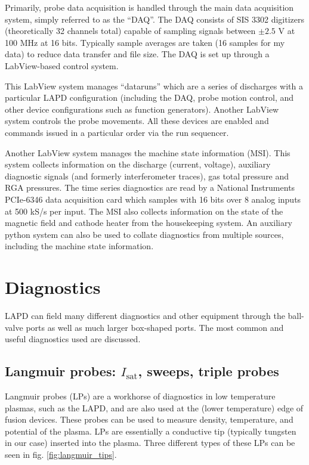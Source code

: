 Primarily, probe data acquisition is handled through the main data acquisition system, simply referred to as the ``DAQ''. The DAQ consists of SIS 3302 digitizers (theoretically 32 channels total) capable of sampling signals between $\pm 2.5$ V at 100 MHz at 16 bits. Typically sample averages are taken (16 samples for my data) to reduce data transfer and file size. The DAQ is set up through a LabView-based control system. 

This LabView system manages ``dataruns'' which are a series of discharges with a particular LAPD configuration (including the DAQ, probe motion control, and other device configurations such as function generators). Another LabView system controls the probe movements. All these devices are enabled and commands issued in a particular order via the run sequencer. 

Another LabView system manages the machine state information (MSI). This system collects information on the discharge (current, voltage), auxiliary diagnostic signals (and formerly interferometer traces), gas total pressure and RGA pressures. The time series diagnostics are read by a National Instruments PCIe-6346 data acquisition card which samples with 16 bits over 8 analog inputs at 500 kS/s per input. The MSI also collects information on the state of the magnetic field and cathode heater from the housekeeping system. An auxiliary python system can also be used to collate diagnostics from multiple sources, including the machine state information.

\section{Diagnostics}

LAPD can field many different diagnostics and other equipment through the ball-valve ports as well as much larger box-shaped ports. The most common and useful diagnostics used are discussed.

\subsection{Langmuir probes: $I_\text{sat}$, sweeps, triple probes}

Langmuir probes (LPs) are a workhorse of diagnostics in low temperature plasmas, such as the LAPD, and are also used at the (lower temperature) edge of fusion devices. These probes can be used to measure density, temperature, and potential of the plasma. LPs are essentially a conductive tip (typically tungsten in our case) inserted into the plasma. Three different types of these LPs can be seen in fig. \ref{fig:langmuir_tips}. 


